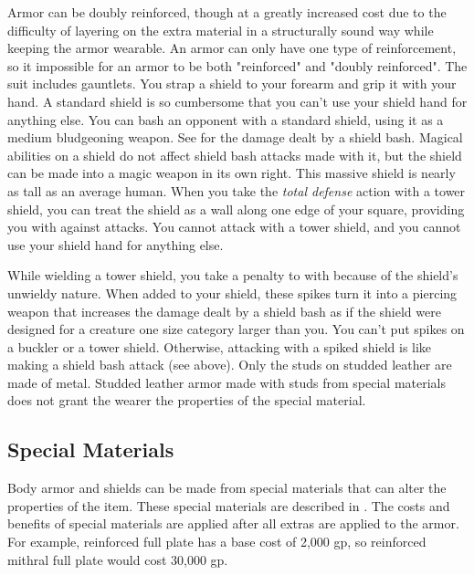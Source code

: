         Armor can be doubly reinforced, though at a greatly increased cost due to the difficulty of layering on the extra material in a structurally sound way while keeping the armor wearable.
        An armor can only have one type of reinforcement, so it impossible for an armor to be both "reinforced" and "doubly reinforced".
         The suit includes gauntlets.
         You strap a shield to your forearm and grip it with your hand. A standard shield is so cumbersome that you can't use your shield hand for anything else.
         You can bash an opponent with a standard shield, using it as a medium bludgeoning weapon. See  for the damage dealt by a shield bash.
        Magical abilities on a shield do not affect shield bash attacks made with it, but the shield can be made into a magic weapon in its own right.
         This massive shield is nearly as tall as an average human.
        When you take the \textit{total defense} action with a tower shield, you can treat the shield as a wall along one edge of your square, providing you with  against attacks.
        You cannot attack with a tower shield, and you cannot use your shield hand for anything else.

        While wielding a tower shield, you take a  penalty to  with  because of the shield's unwieldy nature.
         When added to your shield, these spikes turn it into a piercing weapon that increases the damage dealt by a shield bash as if the shield were designed for a creature one size category larger than you. You can't put spikes on a buckler or a tower shield. Otherwise, attacking with a spiked shield is like making a shield bash attack (see above).
         Only the studs on studded leather are made of metal.
        Studded leather armor made with studs from special materials does not grant the wearer the properties of the special material.

    \subsection{Special Materials}\label{Special Materials}
        Body armor and shields can be made from special materials that can alter the properties of the item.
        These special materials are described in .
        The costs and benefits of special materials are applied after all extras are applied to the armor.
        For example, reinforced full plate has a base cost of 2,000 gp, so reinforced mithral full plate would cost 30,000 gp.

